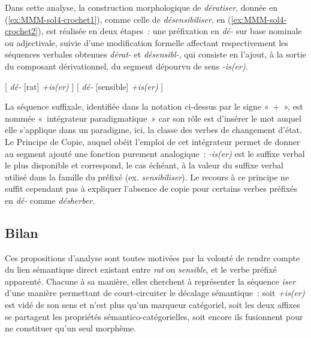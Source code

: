 \documentclass[output=paper]{langsci/langscibook}
\begin{document}
Dans cette analyse, la construction morphologique de \emph{dératiser}, donnée en (\ref{ex:MMM-sol4-crochet1}), comme celle de \emph{désensibiliser},  en (\ref{ex:MMM-sol4-crochet2}),  est réalisée en deux étapes~: une préfixation en \emph{\mbox{dé-}} sur base nominale ou adjectivale, suivie d'une modification formelle affectant respectivement les séquences verbales obtenues \emph{\mbox{dérat-}} et \emph{\mbox{désensibl-}}, qui consiste en l'ajout, à la sortie du composant dérivationnel, du segment dépourvu de sens \emph{\mbox{-is(er)}}.

\begin{exe}
\ex\label{ex:MMM-sol4-crochet1} [ \emph{\mbox{dé-}} [rat] \emph{\mbox{+is(er)}} ]
\ex\label{ex:MMM-sol4-crochet2} [ \emph{\mbox{dé-}} [sensible] \emph{\mbox{+is(er)}} ]
\end{exe}

La séquence suffixale, identifiée dans la notation ci-dessus par le signe «~+~», est nommée «~intégrateur paradigmatique~» car son rôle est d'insérer le mot auquel elle s'applique dans un paradigme, ici, la classe des verbes de changement d'état.  Le Principe de Copie, auquel obéit l'emploi de cet intégrateur permet de donner au segment ajouté une fonction purement analogique~: \emph{\mbox{-is(er)}} est le suffixe verbal le plus disponible et correspond, le cas échéant, à la valeur du suffixe verbal utilisé dans la famille du préfixé (ex. \emph{sensibiliser}).  Le recours à ce principe ne suffit cependant pas à expliquer l'absence de copie  pour certains verbes préfixés en \emph{\mbox{dé-}} comme \emph{désherber}.

\subsection{Bilan}
\label{sec:bilan}

Ces propositions d'analyse sont toutes motivées par la volonté de rendre compte du lien sémantique direct existant entre \emph{rat} ou \emph{sensible}, et le verbe préfixé apparenté.  Chacune à sa manière, elles  cherchent à représenter la séquence \emph{iser} d'une manière permettant de court-circuiter le décalage sémantique~: soit \emph{\mbox{+is(er)}} est vidé de son sens et n'est plus qu'un marqueur catégoriel, soit les deux affixes se partagent les propriétés sémantico-catégorielles, soit encore ils fusionnent pour ne constituer qu'un seul morphème.
\end{document}
